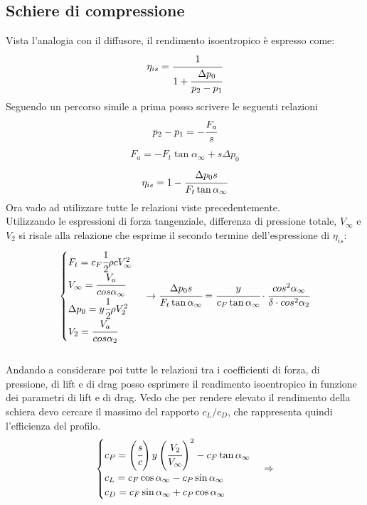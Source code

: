 \subsection{Schiere di compressione}
Vista l'analogia con il diffusore, il rendimento isoentropico è espresso come:
\begin{align*}
\eta_{is} = \cfrac{1}{1 + \cfrac{\Delta p_0}{p_2-p_1}}
\end{align*}
Seguendo un percorso simile a prima posso scrivere le seguenti relazioni
\begin{align*}
p_2-p_1 = -\cfrac{F_a}{s}
\end{align*}
\begin{align*}
F_a = -F_t \tan \alpha_{\infty} + s \Delta p_0
\end{align*}
\begin{align*}
\eta_{is} = 1- \cfrac{\Delta p_0 s}{F_t \tan \alpha_{\infty}}
\end{align*}
Ora vado ad utilizzare tutte le relazioni viste precedentemente.\\
Utilizzando le espressioni di forza tangenziale, differenza di pressione totale, $V_\infty$ e $V_2$ si risale alla relazione che esprime il secondo termine dell'espressione di $\eta_{is}$:
\begin{align*}
\begin{cases}
F_t = c_F \cfrac{1}{2} \rho c V_{\infty}^2\\
V_{\infty} = \cfrac{V_a}{cos \alpha_{\infty}}\\
\Delta p_0 = y \cfrac{1}{2} \rho V_2^2\\
V_2 = \cfrac{V_a}{cos \alpha_2}
\end{cases}
\rightarrow
\cfrac{\Delta p_0 s}{F_t \tan \alpha_{\infty}} = \cfrac{y}{c_F \tan \alpha_{\infty}} \cdot \cfrac{cos^2 \alpha_{\infty}}{\delta \cdot cos^2 \alpha_2}
\end{align*}
\\Andando a considerare poi tutte le relazioni tra i coefficienti di forza, di pressione, di lift e di drag posso esprimere il rendimento isoentropico in funzione dei parametri di lift e di drag.
Vedo che per rendere elevato il rendimento della schiera devo cercare il massimo del rapporto $c_L/c_D$, che rappresenta quindi l'efficienza del profilo.
\begin{align*}
\begin{cases}
c_P = \left(  \cfrac{s}{c} \right) y \left( \cfrac{V_2}{V_{\infty}}  \right)^2 - c_F \tan \alpha_{\infty}\\
c_L = c_F \cos \alpha_{\infty} - c_P \sin \alpha_{\infty}\\
c_D = c_F \sin \alpha_{\infty} + c_P \cos \alpha_{\infty}
\end{cases}
\Rightarrow
\end{align*}
